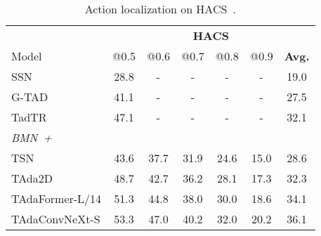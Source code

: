 \documentclass[10pt,journal,compsoc]{IEEEtran}
\newcommand{\tablestyle}[2]{\setlength{\tabcolsep}{#1}\renewcommand{\arraystretch}{#2}\centering\small}
\newcommand\graycell[0]{\cellcolor{midgrey}}
\begin{document}
\begin{table}[t]
    \centering
    \caption{Action localization on HACS~\cite{hacs}.}
    \tablestyle{4.5pt}{1.0}
    \begin{tabular}{lcccccc}
        \toprule
        ~ & \multicolumn{6}{c}{\bf HACS} \\
        \cmidrule(r){2-7}
        Model & @0.5 & @0.6 & @0.7 & @0.8 & @0.9 & \bf Avg. \\
        \midrule
        SSN~\cite{zhao2017ssn} & 28.8 & - & - & - & - & 19.0\\
        G-TAD~\cite{xu2020gtad} & 41.1 & - & - & - & - & 27.5\\
        TadTR~\cite{liu2022tadtr} & 47.1 & - & - & - & - & 32.1 \\
        \midrule
        \textit{\scriptsize BMN~\cite{bmn}+}\\
        TSN~\cite{huangtada} & 43.6 & 37.7 & 31.9 & 24.6 & 15.0 & 28.6 \\
        TAda2D~\cite{huangtada} & 48.7 & 42.7 & 36.2 & 28.1 & 17.3 & 32.3 \\
        \graycell TAdaFormer-L/14 & \graycell51.3 & \graycell44.8 & \graycell38.0 & \graycell30.0 & \graycell18.6 & \graycell34.1 \\
        \graycell TAdaConvNeXt-S &  \graycell53.3 & \graycell47.0 & \graycell40.2 & \graycell32.0 & \graycell20.2 & \graycell36.1\\
        \bottomrule
    \end{tabular}
    \label{tab:hacs-localization}
\end{table}
\end{document}
